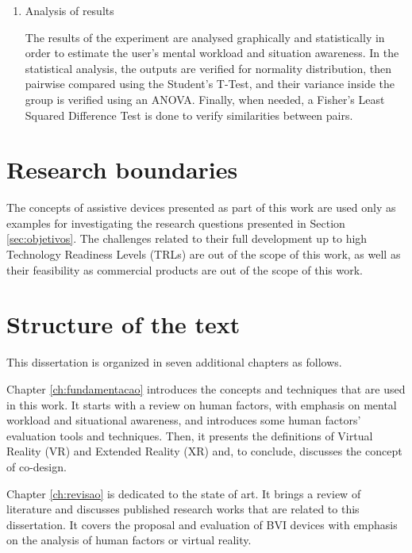 \begin{enumerate}[leftmargin = 6em, label = Step \arabic* -- ]
    \item Analysis of results
    
    The results of the experiment are analysed graphically and statistically in order to estimate the user's mental workload and situation awareness. In the statistical analysis, the outputs are verified for normality distribution, then pairwise compared using the Student’s T-Test, and their variance inside the group is verified using an ANOVA. Finally, when needed, a Fisher’s Least Squared Difference Test is done to verify similarities between pairs.

\end{enumerate}


\FloatBarrier

\section{Research boundaries}


The concepts of assistive devices presented as part of this work are used only as examples for investigating the research questions presented in Section \ref{sec:objetivos}. The challenges related to their full development up to high Technology Readiness Levels (TRLs) are out of the scope of this work, as well as their feasibility as commercial products are out of the scope of this work.


\section{Structure of the text}

This dissertation is organized in seven additional chapters as follows.

Chapter \ref{ch:fundamentacao} introduces the concepts and techniques that are used in this work. It starts with a review on human factors, with emphasis on mental workload and situational awareness, and introduces some human factors’ evaluation tools and techniques. Then, it presents the definitions of Virtual Reality (VR) and Extended Reality (XR) and, to conclude, discusses the concept of co-design.

Chapter \ref{ch:revisao} is dedicated to the state of art. It brings a review of literature and discusses published research works that are related to this dissertation. It covers the proposal and evaluation of BVI devices with emphasis on the analysis of human factors or virtual reality.

